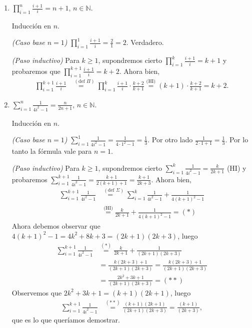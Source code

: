 \begin{enumerate}
\begin{enumerate}
        \item  $\displaystyle{ \prod_{i=1}^n \frac{i+1}{i} = n+1}$, $n\in \mathbb N$.
        
        \rta Inducción en $n$.
        
        \textit{(Caso base $n=1$)} $\prod_{i=1}^1 \frac{i+1}{i} = \frac{2}{1} = 2$. Verdadero.   
        
        \textit{(Paso inductivo)}  Para  $k \ge 1$,  supondremos cierto $\prod_{i=1}^k \frac{i+1}{i} = k+1$ y probaremos que $\prod_{i=1}^{k+1} \frac{i+1}{i} = k+2$. Ahora bien,
        \begin{align*}
            \prod_{i=1}^{k+1} \frac{i+1}{i} &\overset{(\text{def } \Pi)}{=\quad} \prod_{i=1}^k \frac{i+1}{i} \cdot \frac{k+2}{k+1} \overset{\text{(HI)}}{=} (k+1) \cdot \frac{k+2}{k+1} = k+2.
        \end{align*}
        
        
        \item $\displaystyle{ \sum_{i=1}^n \frac{1}{4i^2-1} = \frac{n}{2n+1}}$, $n\in \mathbb N$.
        
        \rta Inducción en $n$.
        
        \textit{(Caso base $n=1$)} $\sum_{i=1}^1 \frac{1}{4i^2-1} = \frac{1}{4\cdot 1^2-1} = \frac13$. Por otro lado $\frac{1}{2\cdot 1+1} = \frac13$. Por lo tanto la fórmula vale para $n=1$.  
        
        \textit{(Paso inductivo)}  Para  $k \ge 1$,  supondremos cierto $\sum_{i=1}^k \frac{1}{4i^2-1} = \frac{k}{2k+1}$ (HI) y probaremos $\sum_{i=1}^{k+1} \frac{1}{4i^2-1} = \frac{k+1}{2(k+1)+1} = \frac{k+1}{2k+3}$. Ahora bien,
        \begin{align*}
        \sum_{i=1}^{k+1} \frac{1}{4i^2-1} &\overset{(\text{def } \Sigma)}{=\quad}\sum_{i=1}^{k} \frac{1}{4i^2-1} +  \frac{1}{4(k+1)^2-1}\\
        &\overset{\text{(HI)}}{=} \frac{k}{2k+1} + \frac{1}{4(k+1)^2-1} = (*)
        \end{align*}
        Ahora debemos observar que $4(k+1)^2-1 = 4k^2 +8k+3 = (2k+1)(2k+3)$, luego
        \begin{align*}
        \sum_{i=1}^{k+1} \frac{1}{4i^2-1} &\overset{(*)}{=} \frac{k}{2k+1} + \frac{1}{(2k+1)(2k+3)} \\
        &=  \frac{k(2k+3) +1}{(2k+1)(2k+3)} = \frac{k(2k+3) +1}{(2k+1)(2k+3)} \\
        &=  \frac{2k^2+3k +1}{(2k+1)(2k+3)}  = (**)
        \end{align*}
        Observemos  que $2k^2+3k +1 = (k+1)(2k+1)$, luego
        \begin{align*}
        \sum_{i=1}^{k+1} \frac{1}{4i^2-1} &\overset{(**)}{=} \frac{(k+1)(2k+1)}{(2k+1)(2k+3)} = \frac{(k+1)}{(2k+3)},
        \end{align*}
        que es lo que queríamos demostrar.
        

\end{enumerate}
\end{enumerate}
